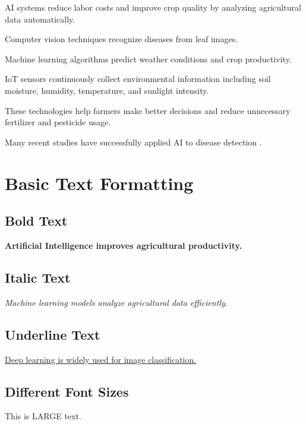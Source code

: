\documentclass[pdflatex,sn-mathphys-num]{sn-jnl}%
\theoremstyle{thmstyleone}%
\theoremstyle{thmstyletwo}%
\theoremstyle{thmstylethree}%
\begin{document}
AI systems reduce labor costs and improve crop quality by analyzing agricultural data automatically.

Computer vision techniques recognize diseases from leaf images.

Machine learning algorithms predict weather conditions and crop productivity.

IoT sensors continuously collect environmental information including soil moisture, humidity, temperature, and sunlight intensity.

These technologies help farmers make better decisions and reduce unnecessary fertilizer and pesticide usage.

Many recent studies have successfully applied AI to disease detection
\cite{journal5,journal8,conf3,book5}.

\section{Basic Text Formatting}
\label{sec:format}

\subsection{Bold Text}

\textbf{Artificial Intelligence improves agricultural productivity.}

\subsection{Italic Text}

\textit{Machine learning models analyze agricultural data efficiently.}

\subsection{Underline Text}

\underline{Deep learning is widely used for image classification.}

\subsection{Different Font Sizes}

{\LARGE This is LARGE text.}

\vspace{0.2cm}
\end{document}

